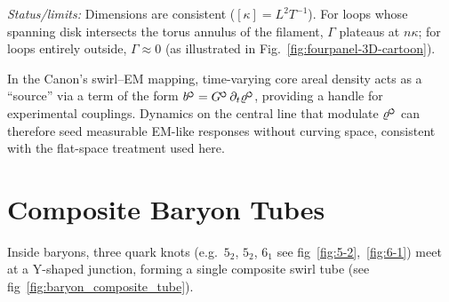 \documentclass[reprint,aps,onecolumn,nofootinbib]{revtex4-2}
\newcommand{\swirlarrow}{%
    \mathchoice{\mkern-2mu\scriptstyle\boldsymbol{\circlearrowleft}}%
    {\mkern-2mu\scriptstyle\boldsymbol{\circlearrowleft}}%
    {\mkern-2mu\scriptscriptstyle\boldsymbol{\circlearrowleft}}%
    {\mkern-2mu\scriptscriptstyle\boldsymbol{\circlearrowleft}}%
}
\begin{document}
    \noindent\emph{Status/limits:} Dimensions are consistent ($[\kappa]=L^2T^{-1}$). For loops whose spanning disk intersects the torus annulus of the filament, $\Gamma$ plateaus at $n\kappa$; for loops entirely outside, $\Gamma\approx 0$ (as illustrated in Fig.~\ref{fig:fourpanel-3D-cartoon}).

    \begin{tcolorbox}[title=\textbf{Swirl–EM correspondence (operational note)}]
        In the Canon’s swirl–EM mapping, time-varying core areal density acts as a “source” via a term of the form $b^{\swirlarrow}=G^{\swirlarrow}\,\partial_t \varrho^{\swirlarrow}$, providing a handle for experimental couplings. Dynamics on the central line that modulate $\varrho^{\swirlarrow}$ can therefore seed measurable EM-like responses without curving space, consistent with the flat-space treatment used here.
    \end{tcolorbox}


\section{Composite Baryon Tubes}
    Inside baryons, three quark knots (e.g.\ $5_2$, $5_2$, $6_1$ see fig~\ref{fig:5-2},~\ref{fig:6-1}) meet at a Y-shaped junction, forming a single composite swirl tube (see fig~\ref{fig:baryon_composite_tube}).
\end{document}
